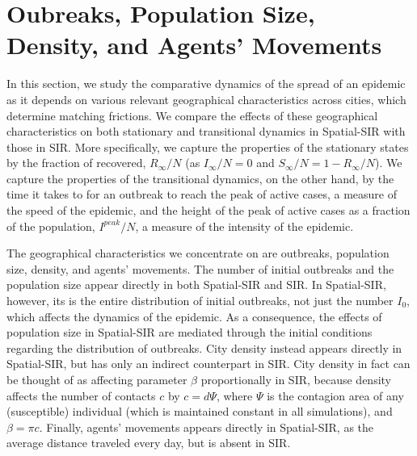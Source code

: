 \documentclass[english,11pt]{article}
\begin{document}

\section{Oubreaks,  Population Size, Density, and Agents' Movements} \label{sec:spatialSIR}

In this section, we study the comparative dynamics of the spread of an epidemic as it depends on various relevant geographical characteristics across cities, which determine matching frictions. We compare the effects of these geographical characteristics on both stationary and transitional dynamics in Spatial-SIR with those in SIR. More specifically, we capture the properties of the stationary states by the fraction of recovered, ${R_{\infty}}/{N}$ (as ${I_{\infty}}/{N}=0$ and ${S_{\infty}}/{N}=1-{R_{\infty}}/{N}$). We capture the properties of the transitional dynamics, on the other hand, by the time it takes to for an outbreak to reach the peak of active cases, a measure of the speed of the epidemic, and the height of the peak of active cases as a fraction of the population, ${I^{peak}}/{N}$, a measure of the intensity of the epidemic. 


The geographical characteristics we concentrate on are outbreaks,  population size, density, and agents' movements. The number of initial outbreaks and the population size appear directly %
in both Spatial-SIR and SIR. In Spatial-SIR, however, its is the entire distribution of initial outbreaks, not just the number $I_{0}$, which affects the dynamics of the epidemic. As a consequence, the effects of population size in Spatial-SIR are mediated through the initial conditions regarding the distribution of outbreaks. %
City density instead appears directly in Spatial-SIR, but has only an indirect counterpart in SIR.  City density in fact can be thought of as affecting parameter $\beta$ proportionally in SIR, because density affects the number of contacts $c$ by $c=d \Psi$, where $\Psi$  is the contagion area of any (susceptible) individual (which is maintained constant in all simulations), and $\beta=\pi c$.
Finally, agents' movements appears directly in Spatial-SIR, as the average distance traveled every day, %
but is absent in SIR. %
\end{document}
